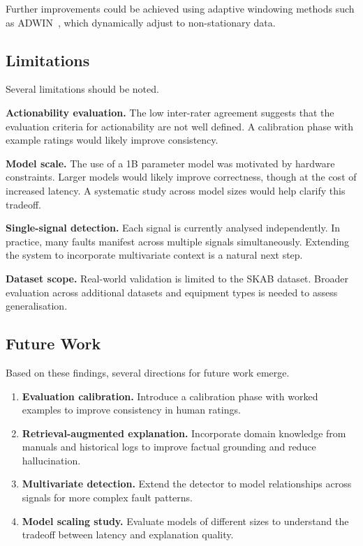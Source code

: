 \documentclass[11pt, a4paper]{article}
\begin{document}
Further improvements could be achieved using adaptive windowing methods 
such as ADWIN~\cite{bifet2007learning}, which dynamically adjust to 
non-stationary data.

\subsection{Limitations}

Several limitations should be noted.

\textbf{Actionability evaluation.} The low inter-rater agreement suggests 
that the evaluation criteria for actionability are not well defined. A 
calibration phase with example ratings would likely improve consistency.

\textbf{Model scale.} The use of a 1B parameter model was motivated by 
hardware constraints. Larger models would likely improve correctness, 
though at the cost of increased latency. A systematic study across model 
sizes would help clarify this tradeoff.

\textbf{Single-signal detection.} Each signal is currently analysed 
independently. In practice, many faults manifest across multiple signals 
simultaneously. Extending the system to incorporate multivariate context 
is a natural next step.

\textbf{Dataset scope.} Real-world validation is limited to the SKAB 
dataset. Broader evaluation across additional datasets and equipment 
types is needed to assess generalisation.

\subsection{Future Work}

Based on these findings, several directions for future work emerge.

\begin{enumerate}
    \item \textbf{Evaluation calibration.} Introduce a calibration phase 
    with worked examples to improve consistency in human ratings.

    \item \textbf{Retrieval-augmented explanation.} Incorporate domain 
    knowledge from manuals and historical logs to improve factual 
    grounding and reduce hallucination.

    \item \textbf{Multivariate detection.} Extend the detector to model 
    relationships across signals for more complex fault patterns.

    \item \textbf{Model scaling study.} Evaluate models of different 
    sizes to understand the tradeoff between latency and explanation 
    quality.
\end{enumerate}
\end{document}
